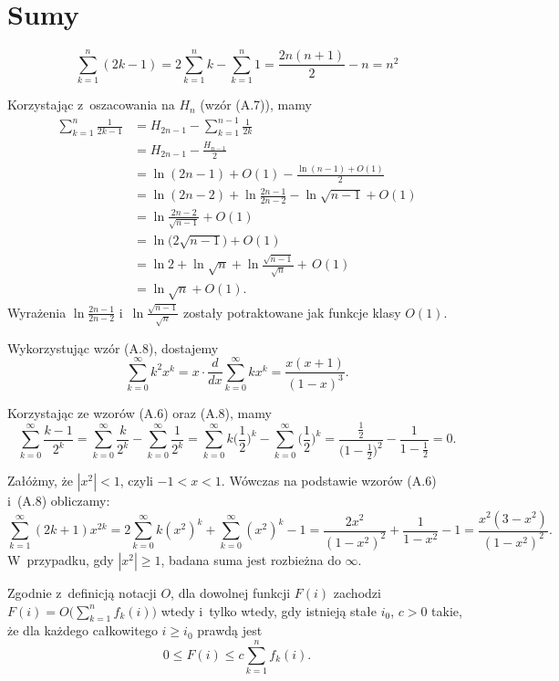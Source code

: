 \chapter{Sumy}


\exercise %
\[
	\sum_{k=1}^n(2k-1) = 2\sum_{k=1}^nk-\sum_{k=1}^n1 = \frac{2n(n+1)}{2}-n = n^2
\]

\exercise %
Korzystając z~oszacowania na $H_n$ (wzór (A.7)), mamy
\begin{align*}
	\sum_{k=1}^n\frac{1}{2k-1} &= H_{2n-1}-\sum_{k=1}^{n-1}\frac{1}{2k} \\
	&= H_{2n-1}-\frac{H_{n-1}}{2} \\
	&= \ln(2n-1)+O(1)-\frac{\ln(n-1)+O(1)}{2} \\
	&= \ln(2n-2)+\ln\frac{2n-1}{2n-2}-\ln\sqrt{n-1}+O(1) \\
	&= \ln\frac{2n-2}{\sqrt{n-1}}+O(1) \\[1mm]
	&= \ln\bigl(2\sqrt{n-1}\bigr)+O(1) \\
	&= \ln2+\ln\sqrt{n}+\ln\frac{\sqrt{n-1}}{\sqrt{n}}+\,O(1) \\
	&= \ln\sqrt{n}+O(1).
\end{align*}
Wyrażenia $\ln\frac{2n-1}{2n-2}$ i~$\ln\frac{\sqrt{n-1}}{\sqrt{n}}$ zostały potraktowane jak funkcje klasy $O(1)$.

\exercise %
Wykorzystując wzór (A.8), dostajemy
\[
	\sum_{k=0}^\infty k^2x^k = x\cdot\frac{d}{dx}\sum_{k=0}^\infty kx^k = \frac{x(x+1)}{(1-x)^3}.
\]

\exercise %
Korzystając ze wzorów (A.6) oraz (A.8), mamy
\[
	\sum_{k=0}^\infty\frac{k-1}{2^k} = \sum_{k=0}^\infty\frac{k}{2^k}-\sum_{k=0}^\infty\frac{1}{2^k} = \sum_{k=0}^\infty k\biggl(\frac{1}{2}\biggr)^k-\sum_{k=0}^\infty\biggl(\frac{1}{2}\biggr)^k = \frac{\frac{1}{2}}{\bigl(1-\frac{1}{2}\bigr)^2}-\frac{1}{1-\frac{1}{2}} = 0.
\]

\exercise %
Załóżmy, że $|x^2|<1$, czyli $-1<x<1$.
Wówczas na podstawie wzorów (A.6) i~(A.8) obliczamy:
\[
	\sum_{k=1}^\infty(2k+1)x^{2k} = 2\sum_{k=0}^\infty k(x^2)^k+\sum_{k=0}^\infty(x^2)^k-1 = \frac{2x^2}{(1-x^2)^2}+\frac{1}{1-x^2}-1 = \frac{x^2(3-x^2)}{(1-x^2)^2}.
\]
W~przypadku, gdy $|x^2|\ge1$, badana suma jest rozbieżna do $\infty$.

\exercise %

\noindent Zgodnie z~definicją notacji $O$, dla dowolnej funkcji $F(i)$ zachodzi $F(i)=O\bigl(\sum_{k=1}^nf_k(i)\bigr)$ wtedy i~tylko wtedy, gdy istnieją stałe $i_0$, $c>0$ takie, że dla każdego całkowitego $i\ge i_0$ prawdą jest
\[
	0 \le F(i) \le c\sum_{k=1}^nf_k(i).
\]

